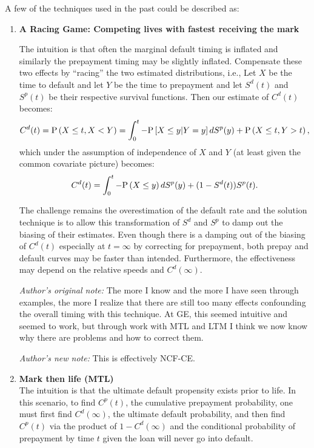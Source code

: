 \documentclass[10pt]{article}
\begin{document}
A few of the techniques used in the past could be described as:
\begin{enumerate}

\item {\bf A Racing Game: Competing lives with fastest receiving the mark}

	The intuition is that often the marginal default timing is inflated and similarly the prepayment timing may be slightly inflated.
	Compensate these two effects by ``racing'' the two estimated distributions, i.e., Let $X$ be the time to default and let $Y$ be the time 
	to prepayment and let $S^d(t)$ and $S^p(t)$ be their respective survival functions.  Then our estimate of $C^d(t)$ becomes:
	$$C^d(t)=\text{P}\left({X \le t, X<Y}\right)=\int_0^t-\text{P}\left[{{X \le y}|{Y=y}}\right]dS^p(y)+\text{P}\left({X \le t,Y > t}\right),$$
	which under the assumption of independence of $X$ and $Y$ (at least given the common covariate picture) becomes:
	$$C^d(t)=\int_0^t-\text{P}\left({X \le y}\right)dS^p(y)+(1-S^d(t))S^p(t).$$

	The challenge remains the overestimation of the default rate and the solution technique is to allow this 
	transformation of $S^d$ and $S^p$  to damp out the biasing of their estimates.  Even though there is a damping out of the biasing of $C^d(t)$ especially at
	$t=\infty$ by 
	correcting for prepayment, both prepay and default curves may be faster than intended. Furthermore, the effectiveness may depend on the relative speeds 
	and $C^d(\infty)$.  

        {\em Author's original note:} The more I know and the more I have seen through examples, the more I realize that there are still too many effects 
	confounding the overall timing with this technique.  
	At GE, this seemed intuitive and seemed to work, but through work with MTL and LTM I think we now know why there
        are problems and how to correct them.

        {\em Author's new note:} This is effectively NCF-CE.

\item {\bf Mark then life (MTL)}\\

	The intuition is that the ultimate default propensity exists prior to life.
	In this scenario, to find $C^p(t)$, the cumulative 
	prepayment probability, one must first find $C^d(\infty)$, the ultimate default probability, and then find $C^p(t)$ via the product of 
	$1-C^d(\infty)$ and the 
	conditional probability of prepayment by time $t$ given the loan will never go into default. 


\end{enumerate}
\end{document}
